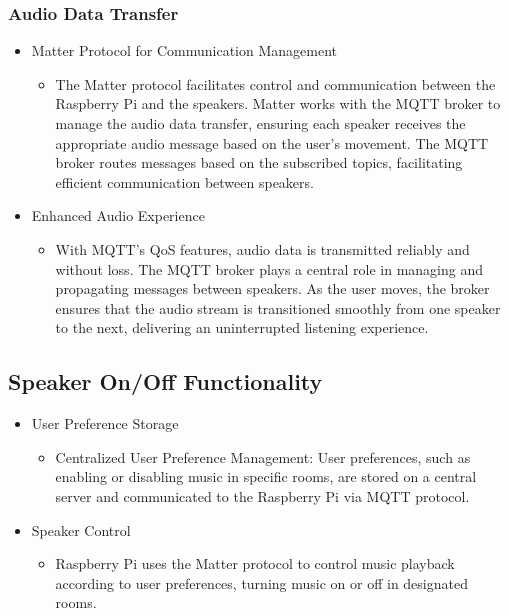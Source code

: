 \documentclass[conference]{IEEEtran}
\begin{document}
\subsubsection{Audio Data Transfer}
\begin{itemize}
    \item Matter Protocol for Communication Management
\begin{itemize}
    \item The Matter protocol facilitates control and communication between the Raspberry Pi and the speakers. Matter works with the MQTT broker to manage the audio data transfer, ensuring each speaker receives the appropriate audio message based on the user's movement. The MQTT broker routes messages based on the subscribed topics, facilitating efficient communication between speakers.\\
\end{itemize}
\end{itemize}
\begin{itemize}
    \item Enhanced Audio Experience
\begin{itemize}
    \item With MQTT’s QoS features, audio data is transmitted reliably and without loss. The MQTT broker plays a central role in managing and propagating messages between speakers. As the user moves, the broker ensures that the audio stream is transitioned smoothly from one speaker to the next, delivering an uninterrupted listening experience.
\end{itemize}
\end{itemize}

\subsection{Speaker On/Off Functionality}
\begin{itemize}
    \item User Preference Storage
\begin{itemize}
    \item Centralized User Preference Management: User preferences, such as enabling or disabling music in specific rooms, are stored on a central server and communicated to the Raspberry Pi via MQTT protocol.\\
\end{itemize}
\end{itemize}
\begin{itemize}
    \item Speaker Control
\begin{itemize}
    \item Raspberry Pi uses the Matter protocol to control music playback according to user preferences, turning music on or off in designated rooms.\\
\end{itemize}
\end{itemize}
\end{document}
